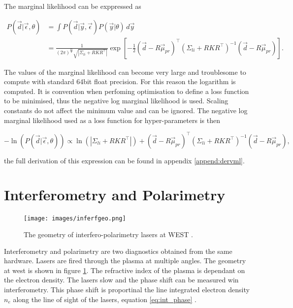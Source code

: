 The marginal likelihood can be exppressed as

\begin{equation}
\begin{aligned}
 P(\vec d|\vec\epsilon,\theta) &= \int P(\vec{d}|\vec{y},\vec\epsilon)P(\vec{y}|\theta)  \, d\vec y \\
 &= \frac{1}{(2\pi)^{\frac{m}{2}} \sqrt{|\Sigma_{li} + RKR^\top|}} \exp\left[ -\frac{1}{2} (\vec{d} - R\vec{\mu}_{pr})^{\top} (\Sigma_{li} + R K R^{\top})^{-1} (\vec{d} - R\vec{\mu}_{pr}) \right].
\end{aligned}
\end{equation}

The values of the marginal likelihood can become very large and troublesome to compute with standard 64bit float precision. For this reason the logarithm is computed. It is convention when perfoming optimisation to define a loss function to be minimised, thus the negative log marginal likelihood is used. Scaling constants do not affect the minimum value and can be ignored. The negative log marginal likelihood used as a loss function for hyper-parameters is then 

\begin{equation}
-\ln(P(\vec d| \vec \epsilon,\theta)) \propto \ln(|\Sigma_{li}+RKR^\top|) +  (\vec{d} - R\vec{\mu}_{pr})^{\top} (\Sigma_{li} + R K R^{\top})^{-1} (\vec{d} - R\vec{\mu}_{pr}),
\end{equation}

the full derivation of this expression can be found in appendix \ref{append:dervml}.


\section{Interferometry and Polarimetry}

\begin{figure}
  \centering
  \texttt{[image: images/inferfgeo.png]}
  \caption{The geometry of interfero-polarimetry lasers at \gls{WEST} \cite{westinterfero}.}
  \label{fig:magfluxsurf}
\end{figure}

Interferometry and polarimetry are two diagnostics obtained from the same hardware. Lasers are fired through the plasma at multiple angles. The geometry at \gls{west} is shown in figure \ref{fig:magfluxsurf}. The refractive index of the plasma is dependant on the electron density. The lasers slow and the phase shift can be measured win interferometry. This phase shift is proportinal the line integrated electron density $n_e$ along the line of sight of the lasers, equation \ref{eq:int_phase} \cite{princPlasDiag}.

